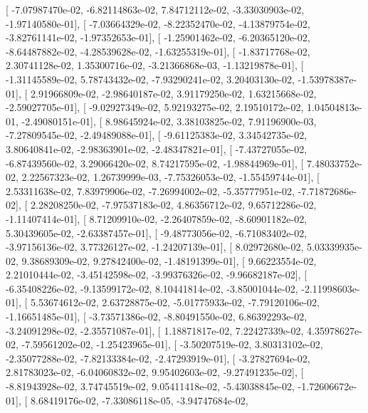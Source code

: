 \documentclass{article}
\begin{document}
       [ -7.07987470e-02,  -6.82114863e-02,   7.84712112e-02,
         -3.33030903e-02,  -1.97140580e-01],
       [ -7.03664329e-02,  -8.22352470e-02,  -4.13879754e-02,
         -3.82761141e-02,  -1.97352653e-01],
       [ -1.25901462e-02,  -6.20365120e-02,  -8.64487882e-02,
         -4.28539628e-02,  -1.63255319e-01],
       [ -1.83717768e-02,   2.30741128e-02,   1.35300716e-02,
         -3.21366868e-03,  -1.13219878e-01],
       [ -1.31145589e-02,   5.78743432e-02,  -7.93290241e-02,
          3.20403130e-02,  -1.53978387e-01],
       [  2.91966809e-02,  -2.98640187e-02,   3.91179250e-02,
          1.63215668e-02,  -2.59027705e-01],
       [ -9.02927349e-02,   5.92193275e-02,   2.19510172e-02,
          1.04504813e-01,  -2.49080151e-01],
       [  8.98645924e-02,   3.38103825e-02,   7.91196900e-03,
         -7.27809545e-02,  -2.49489088e-01],
       [ -9.61125383e-02,   3.34542735e-02,   3.80640841e-02,
         -2.98363901e-02,  -2.48347821e-01],
       [ -7.43727055e-02,  -6.87439560e-02,   3.29066420e-02,
          8.74217595e-02,  -1.98844969e-01],
       [  7.48033752e-02,   2.22567323e-02,   1.26739999e-03,
         -7.75326053e-02,  -1.55459744e-01],
       [  2.53311638e-02,   7.83979906e-02,  -7.26994002e-02,
         -5.35777951e-02,  -7.71872686e-02],
       [  2.28208250e-02,  -7.97537183e-02,   4.86356712e-02,
          9.65712286e-02,  -1.11407414e-01],
       [  8.71209910e-02,  -2.26407859e-02,  -8.60901182e-02,
          5.30439605e-02,  -2.63387457e-01],
       [ -9.48773056e-02,  -6.71083402e-02,  -3.97156136e-02,
          3.77326127e-02,  -1.24207139e-01],
       [  8.02972680e-02,   5.03339935e-02,   9.38689309e-02,
          9.27842400e-02,  -1.48191399e-01],
       [  9.66223554e-02,   2.21010444e-02,  -3.45142598e-02,
         -3.99376326e-02,  -9.96682187e-02],
       [ -6.35408226e-02,  -9.13599172e-02,   8.10441814e-02,
         -3.85001044e-02,  -2.11998603e-01],
       [  5.53674612e-02,   2.63728875e-02,  -5.01775933e-02,
         -7.79120106e-02,  -1.16651485e-01],
       [ -3.73571386e-02,  -8.80491550e-02,   6.86392293e-02,
         -3.24091298e-02,  -2.35571087e-01],
       [  1.18871817e-02,   7.22427339e-02,   4.35978627e-02,
         -7.59561202e-02,  -1.25423965e-01],
       [ -3.50207519e-02,   3.80313102e-02,  -2.35077288e-02,
         -7.82133384e-02,  -2.47293919e-01],
       [ -3.27827694e-02,   2.81783023e-02,  -6.04060832e-02,
          9.95402603e-02,  -9.27491235e-02],
       [ -8.81943928e-02,   3.74745519e-02,   9.05411418e-02,
         -5.43038845e-02,  -1.72606672e-01],
       [  8.68419176e-02,  -7.33086118e-05,  -3.94747684e-02,
\end{document}
